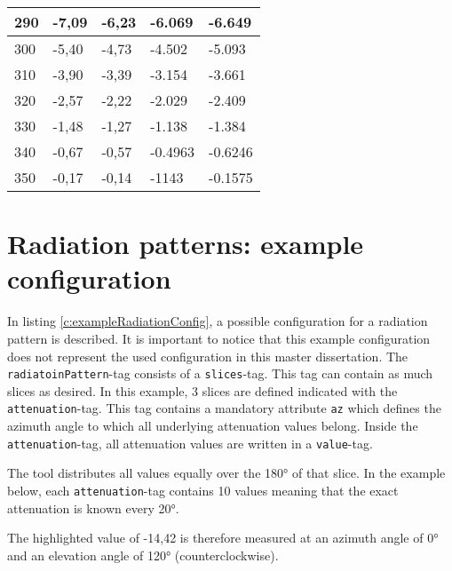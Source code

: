 \begin{table*}[!ht]
\begin{tabular}{|l|l|l|l|l|}
290 & -7,09 & -6,23 & -6.069 & -6.649 \\ \hline
300 & -5,40 & -4,73 & -4.502 & -5.093 \\ \hline
310 & -3,90 & -3,39 & -3.154 & -3.661 \\ \hline
320 & -2,57 & -2,22 & -2.029 & -2.409 \\ \hline
330 & -1,48 & -1,27 & -1.138 & -1.384 \\ \hline
340 & -0,67 & -0,57 & -0.4963 & -0.6246 \\ \hline
350 & -0,17 & -0,14 & -1143 & -0.1575 \\ \hline
\end{tabular}
\label{tab:datasheetRadiation}
\end{table*}



\chapter{Radiation patterns: example configuration}
\label{ch:radpatexampleconfig}

In listing \ref{c:exampleRadiationConfig}, a possible configuration for a radiation pattern is described.
It is important to notice that this example configuration does not represent the used configuration in this master dissertation.
The \verb|radiatoinPattern|-tag consists of a \verb|slices|-tag. This tag can contain as much slices as desired.
In this example, 3 slices are defined indicated with the \verb|attenuation|-tag. This tag contains a mandatory attribute \verb|az| 
which defines the azimuth angle to which all underlying attenuation values belong.
Inside the \verb|attenuation|-tag, all attenuation values are written in a \verb|value|-tag.

The tool distributes all values equally over the \ang{180} of that slice. In the example below, each \verb|attenuation|-tag contains 10 values
meaning that the exact attenuation is known every \ang{20}.

The highlighted value of -14,42 is therefore measured at an azimuth angle of \ang{0} and an elevation angle of \ang{120} (counterclockwise).

